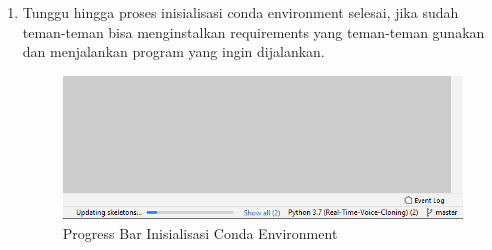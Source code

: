 \begin{enumerate}
\item Tunggu hingga proses inisialisasi conda environment selesai, jika sudah teman-teman bisa menginstalkan requirements yang teman-teman gunakan dan menjalankan program yang ingin dijalankan.
\begin{figure}[H]
\centering
\includegraphics[scale=.4]{figures/cenv7}
\caption{Progress Bar Inisialisasi Conda Environment}
\label{cenv7}
\end{figure}

\end{enumerate}

